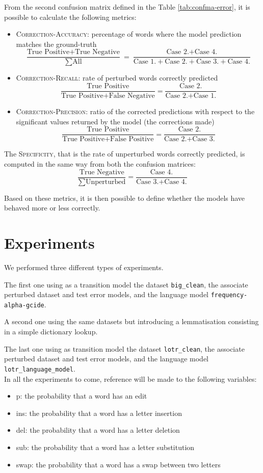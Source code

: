 From the second confusion matrix defined in the Table \ref{tab:confma-error}, it is possible to calculate the 
following metrics:
\begin{itemize}
	\item \textsc{Correction-Accuracy}: percentage of words where the model prediction matches the 
	ground-truth  
	\[ \frac{\mbox{True Positive} + \mbox{True Negative}}{\sum \mbox{All}} = \frac{\mbox{Case 2.} + \mbox{Case 
	4.}}{\mbox{Case 1.} + \mbox{Case 2.} + \mbox{Case 3.} + \mbox{Case 4.}}\]
	\item \textsc{Correction-Recall}: rate of perturbed words correctly predicted
\[ \frac{\mbox{True Positive}}{\mbox{True Positive} + \mbox{False Negative}} = \frac{\mbox{Case 
		2.}}{\mbox{Case 2.} + \mbox{Case 1.}}\]
	\item \textsc{Correction-Precision}: ratio of the corrected predictions with respect to the significant values 
	returned by the 
	model (the corrections made) 
		\[ \frac{\mbox{True Positive}}{\mbox{True Positive} + \mbox{False Positive}} = \frac{\mbox{Case 
		2.}}{\mbox{Case 2.} + \mbox{Case 3.}}\]
\end{itemize}

The \textsc{Specificity}, that is the rate of unperturbed words correctly predicted, is computed in the same way 
from both the confusion matrices:
\[ \frac{\mbox{True Negative}}{\sum \mbox{Unperturbed}} = \frac{\mbox{Case 4.}}{\mbox{Case 3.} + 
	\mbox{Case 4.}}\]


Based on these metrics, it is then possible to define whether the models have behaved more or less correctly.

\section{Experiments}
We performed three different types of experiments.

The first one using as a transition model the dataset \texttt{big\_clean}, the associate perturbed dataset and test error 
models, and the language model \texttt{frequency-alpha-gcide}.

A second one using the same datasets but introducing a lemmatisation consisting in a simple dictionary lookup.

The last one using as transition model the dataset \texttt{lotr\_clean}, the associate perturbed dataset and test error 
models, and the language model \texttt{lotr\_language\_model}.\\

In all the experiments to come, reference will be made to the following variables:
\begin{itemize}
	\item p: the probability that a word has an edit
	\item ins: the probability that a word has a letter insertion
	\item del: the probability that a word has a letter deletion
	\item sub: the probability that a word has a letter substitution
	\item swap: the probability that a word has a swap between two letters
\end{itemize}

